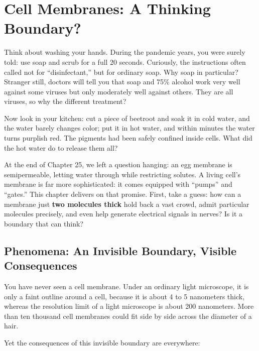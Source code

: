 \chapter{Cell Membranes: A Thinking Boundary?}

\begin{kaichang}
Think about washing your hands. During the pandemic years, you were surely told: use soap and scrub for a full 20 seconds. Curiously, the instructions often called not for ``disinfectant,'' but for ordinary soap. Why soap in particular? Stranger still, doctors will tell you that soap and 75\% alcohol work very well against some viruses but only moderately well against others. They are all viruses, so why the different treatment?

Now look in your kitchen: cut a piece of beetroot and soak it in cold water, and the water barely changes color; put it in hot water, and within minutes the water turns purplish red. The pigments had been safely confined inside cells. What did the hot water do to release them all?

At the end of Chapter 25, we left a question hanging: an egg membrane is semipermeable, letting water through while restricting solutes. A living cell's membrane is far more sophisticated: it comes equipped with ``pumps'' and ``gates.'' This chapter delivers on that promise. First, take a guess: how can a membrane just \textbf{two molecules thick} hold back a vast crowd, admit particular molecules precisely, and even help generate electrical signals in nerves? Is it a boundary that can think?
\end{kaichang}

\section{Phenomena: An Invisible Boundary, Visible Consequences}

You have never seen a cell membrane. Under an ordinary light microscope, it is only a faint outline around a cell, because it is about 4 to 5 nanometers thick, whereas the resolution limit of a light microscope is about 200 nanometers. More than ten thousand cell membranes could fit side by side across the diameter of a hair.

Yet the consequences of this invisible boundary are everywhere:

